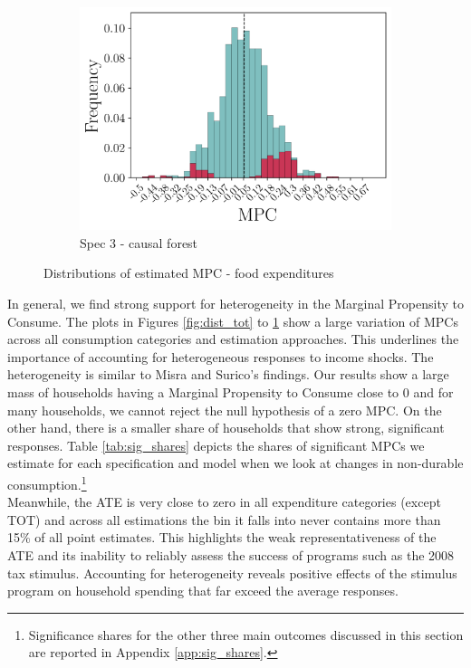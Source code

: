 \begin{figure}[t]
\begin{subfigure}{0.33\linewidth}
        \includegraphics[width=\linewidth]{figures/distributions/spec3_cf_chFDexp.png}
        \caption{Spec 3 - causal forest}
    \end{subfigure}\hfill
    \caption{Distributions of estimated MPC - food expenditures}
    \label{fig:dist_fd}
\end{figure}
\noindent In general, we find strong support for heterogeneity in the Marginal Propensity to Consume. The plots in Figures \ref{fig:dist_tot} to \ref{fig:dist_fd} show a large variation of MPCs across all consumption categories and estimation approaches. This underlines the importance of accounting for heterogeneous responses to income shocks. The heterogeneity is similar to Misra and Surico’s findings. Our results show a large mass of households having a Marginal Propensity to Consume close to 0 and for many households, we cannot reject the null hypothesis of a zero MPC. On the other hand, there is a smaller share of households that show strong, significant responses. Table \ref{tab:sig_shares} depicts the shares of significant MPCs we estimate for each specification and model when we look at changes in non-durable consumption.\footnote{Significance shares for the other three main outcomes discussed in this section are reported in Appendix \ref{app:sig_shares}.} \\
Meanwhile, the ATE is very close to zero in all expenditure categories (except TOT) and across all estimations the bin it falls into never contains more than 15\% of all point estimates. This highlights the weak representativeness of the ATE and its inability to reliably assess the success of programs such as the 2008 tax stimulus. Accounting for heterogeneity reveals positive effects of the stimulus program on household spending that far exceed the average responses. \\
